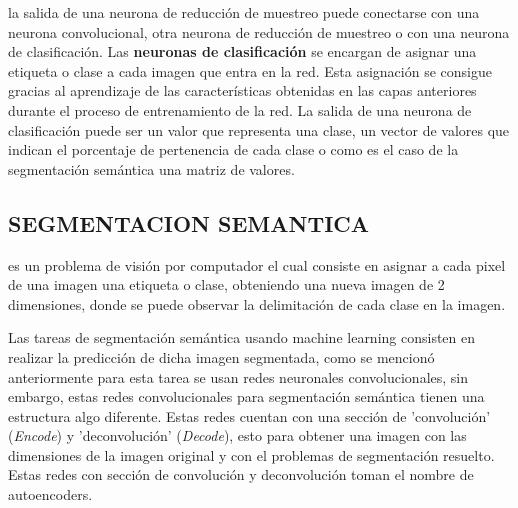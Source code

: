 
la salida de una neurona de reducción de muestreo puede conectarse con una neurona convolucional, otra neurona de reducción de muestreo o con una neurona de clasificación. Las \textbf{neuronas de clasificación} se encargan de asignar una etiqueta o clase a cada imagen que entra en la red. Esta asignación se consigue gracias al aprendizaje de las características obtenidas en las capas anteriores durante el proceso de entrenamiento de la red. La salida de una neurona de clasificación puede ser un valor que representa una clase, un vector de valores que indican el porcentaje de pertenencia de cada clase o como es el caso de la segmentación semántica una matriz de valores. 

\subsection{SEGMENTACION SEMANTICA} es un problema de visión por computador el cual consiste en asignar a cada pixel de una imagen una etiqueta o clase, obteniendo una nueva imagen de 2 dimensiones, donde se puede observar la delimitación de cada clase en la imagen. 


Las tareas de segmentación semántica usando machine learning consisten en realizar la predicción de dicha imagen segmentada, como se mencionó anteriormente para esta tarea se usan redes neuronales convolucionales, sin embargo, estas redes convolucionales para segmentación semántica tienen una estructura algo diferente. Estas redes cuentan con una sección de 'convolución' (\textit{Encode}) y 'deconvolución' (\textit{Decode}), esto para obtener una imagen con las dimensiones de la imagen original y con el problemas de segmentación resuelto. Estas redes con sección de convolución y deconvolución toman el nombre de autoencoders. 


